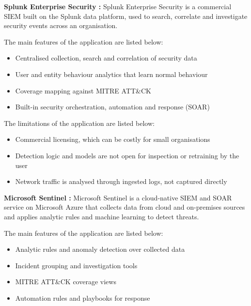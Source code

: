 \vspace{6pt}
\textbf{Splunk Enterprise Security \cite{splunkes}:} Splunk Enterprise Security is a commercial SIEM built on the Splunk data platform, used to search, correlate and investigate security events across an organisation.

The main features of the application are listed below:
\begin{itemize}
    \setlength{\itemsep}{1pt}
    \setlength{\parskip}{0pt}
    \setlength{\parsep}{0pt}
    \item Centralised collection, search and correlation of security data
    \item User and entity behaviour analytics that learn normal behaviour
    \item Coverage mapping against MITRE ATT\&CK
    \item Built-in security orchestration, automation and response (SOAR)
\end{itemize}

The limitations of the application are listed below:
\begin{itemize}
    \setlength{\itemsep}{1pt}
    \setlength{\parskip}{0pt}
    \setlength{\parsep}{0pt}
    \item Commercial licensing, which can be costly for small organisations
    \item Detection logic and models are not open for inspection or retraining by the user
    \item Network traffic is analysed through ingested logs, not captured directly
\end{itemize}

\vspace{6pt}
\textbf{Microsoft Sentinel \cite{sentineldocs}:} Microsoft Sentinel is a cloud-native SIEM and SOAR service on Microsoft Azure that collects data from cloud and on-premises sources and applies analytic rules and machine learning to detect threats.

The main features of the application are listed below:
\begin{itemize}
    \setlength{\itemsep}{1pt}
    \setlength{\parskip}{0pt}
    \setlength{\parsep}{0pt}
    \item Analytic rules and anomaly detection over collected data
    \item Incident grouping and investigation tools
    \item MITRE ATT\&CK coverage views
    \item Automation rules and playbooks for response
\end{itemize}

